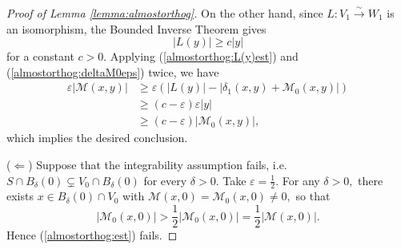 \documentclass[12pt]{amsart}
\newcommand{\calM}{\mathcal{M}}
\renewcommand{\1}{{\mathbf 1}}
\newcommand{\eps}{{\varepsilon}}
\theoremstyle{others}
\newtheorem{rmk}[thm]{Remark}
\numberwithin{equation}{section}
\begin{document}
\begin{proof}[Proof of Lemma \ref{lemma:almostorthog}]
    On the other hand, since $L : V_1 \stackrel{\sim}{\to} W_1$ is an isomorphism, the Bounded Inverse Theorem gives  %
\begin{equation}\label{almostorthog:L(y)est}
    |L(y)| \geq c |y|
\end{equation}
for a constant $c > 0.$
    Applying (\ref{almostorthog:L(y)est}) and (\ref{almostorthog:deltaM0eps}) twice, we have
    \begin{equation}
        \begin{split}
           \eps |\calM(x,y)| & \geq \eps \left( |L(y)| - |\delta_1(x,y) + \calM_0(x,y)| \right) \\
            & \geq (c - \eps) \eps |y| \\
            & \geq (c - \eps)|\calM_0(x,y)|,
        \end{split}
    \end{equation}
    which implies the desired conclusion.

\vspace{2mm}

    \noindent ($\Leftarrow$) Suppose that the integrability assumption fails, i.e. $S \cap B_\delta(0) \subsetneq V_0 \cap B_\delta(0)$ for every $\delta > 0.$ Take $\eps = \frac12.$ For any $\delta > 0,$ there exists $x \in B_{\delta}(0) \cap V_0$ with $\calM(x,0) = \calM_0(x,0) \neq 0,$ so that
    $$|\calM_0(x,0) | > \frac12 |\calM_0(x,0)| = \frac12 |\calM(x,0)|.$$
    Hence (\ref{almostorthog:est}) fails.
\end{proof}

\end{document}
